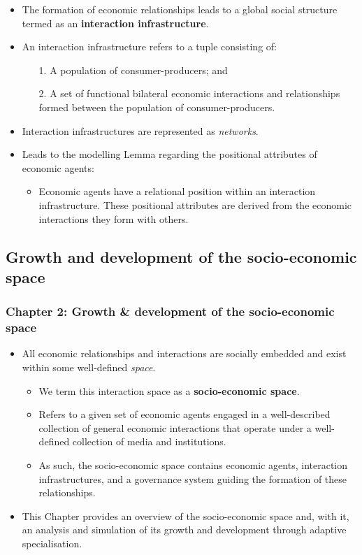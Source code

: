 \documentclass[10pt]{beamer}
\begin{document}
\begin{frame} %
\begin{itemize}
\item The formation of economic relationships leads to a global social structure termed as an \textbf{interaction infrastructure}.
\medskip
\item An interaction infrastructure refers to a tuple consisting of:
\begin{itemize}
\medskip
\item[1.] A population of consumer-producers; and
\medskip
\item[2.] A set of functional bilateral economic interactions and relationships formed between the population of consumer-producers.
\end{itemize}
\medskip
\item Interaction infrastructures are represented as \emph{networks}.
\medskip
\item Leads to the modelling Lemma regarding the positional attributes of economic agents: 
\begin{itemize}
\medskip
\item Economic agents have a relational position within an interaction infrastructure. These positional attributes are derived from the economic interactions they form with others.
\end{itemize}
\end{itemize}
\end{frame}

\subsection{Growth and development of the socio-economic space}

\begin{frame} \frametitle{Chapter 2: Growth \& development of the socio-economic space}
\begin{itemize}
\item All economic relationships and interactions are socially embedded and exist within some well-defined \emph{space}. 
\begin{itemize}
\medskip
\item We term this interaction space as a \textbf{socio-economic space}.
\medskip
\item Refers to a given set of economic agents engaged in a well-described collection of general economic interactions that operate under a well-defined collection of media and institutions.
\medskip
\item As such, the socio-economic space contains economic agents, interaction infrastructures, and a governance system guiding the formation of these relationships.
\end{itemize}
\medskip
\item This Chapter provides an overview of the socio-economic space and, with it, an analysis and simulation of its growth and development through adaptive specialisation.
\end{itemize}
\end{frame}
\end{document}

